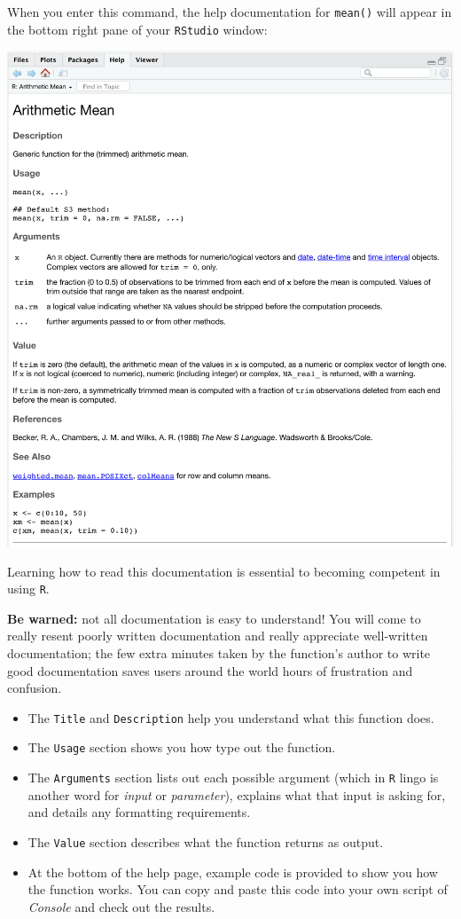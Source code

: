 \documentclass[
]{book}
\begin{document}
When you enter this command, the help documentation for \texttt{mean()} will appear in the bottom right pane of your \texttt{RStudio} window:

\includegraphics{img/functions_help.png}

Learning how to read this documentation is essential to becoming competent in using \texttt{R}.

\textbf{Be warned:} not all documentation is easy to understand! You will come to really resent poorly written documentation and really appreciate well-written documentation; the few extra minutes taken by the function's author to write good documentation saves users around the world hours of frustration and confusion.

\begin{itemize}
\item
  The \texttt{Title} and \texttt{Description} help you understand what this function does.
\item
  The \texttt{Usage} section shows you how type out the function.
\item
  The \texttt{Arguments} section lists out each possible argument (which in \texttt{R} lingo is another word for \emph{input} or \emph{parameter}), explains what that input is asking for, and details any formatting requirements.
\item
  The \texttt{Value} section describes what the function returns as output.
\item
  At the bottom of the help page, example code is provided to show you how the function works. You can copy and paste this code into your own script of \emph{Console} and check out the results.
\end{itemize}
\end{document}
